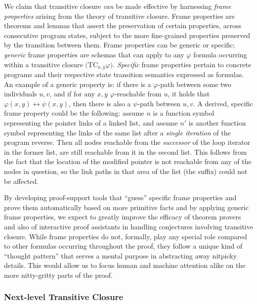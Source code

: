 
We claim that transitive closure \emph{can} be made effective by harnessing
\emph{frame properties} arising from the theory of transitive closure.
Frame properties are theorems and lemmas that assert the preservation of
certain properties, across consecutive program states, subject to the more
fine-grained properties preserved by the transition between them.
Frame properties can be generic or specific; \emph{generic} frame properties are
schemas that can apply to any $\varphi$ formula occurring within a transitive
closure $\big(\mathrm{TC}_{x,y}\varphi\big)$.
\emph{Specific} frame properties pertain to concrete programs and their respective
state transition semantics expressed as formulas.
An example of a generic property is: if there is a $\varphi$-path between some
two individuals $u, v$, and if for any $x,y$ $\varphi$-reachable from $u$, it
holds that $\varphi(x,y) \leftrightarrow \psi(x,y)$, then there is also a
$\psi$-path between $u, v$.
A derived, specific frame property could be the following: assume $n$ is a
function symbol representing the pointer links of a linked list, and assume
$n'$ is another function symbol representing the links of the same list after
a \emph{single iteration} of the program \textsf{reverse}.
Then all nodes reachable from the \emph{successor} of the loop iterator in the
former list, are still reachable from it in the second list.
This follows from the fact that the location of the modified pointer is not
reachable from any of the nodes in question, so the link paths in that area of
the list (the suffix) could not be affected.

By developing proof-support tools that ``guess'' specific frame properties
and prove them automatically based on more primitive facts and by applying
generic frame properties, we expect to greatly improve the efficacy of theorem
provers and also of interactive proof assistants in handling conjectures
involving transitive closure.
While frame properties do not, formally, play any special role compared to
other formulas occurring throughout the proof, they follow a unique kind of
``thought pattern'' that serves a mental purpose in abstracting away nitpicky
details.
This would allow us to focus human and machine attention alike on the more
nitty-gritty parts of the proof.

\subsubsection{Next-level Transitive Closure}

